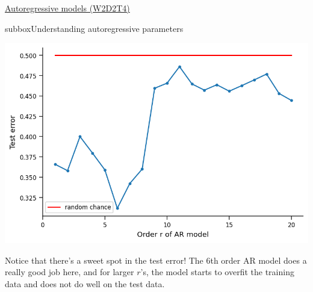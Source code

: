 \begin{textbox}{\href{https://compneuro.neuromatch.io/tutorials/W2D2_LinearSystems/student/W2D2_Tutorial4.html}{Autoregressive models (W2D2T4)} }
\begin{subbox}{subbox}{Understanding autoregressive parameters}
\begin{center}
\includegraphics[scale=0.3]{Figures/LS/CDS_Figure13.png}
\end{center}


Notice that there's a sweet spot in the test error! The 6th order AR model does a really good job here, and for larger $r$'s, the model starts to overfit the training data and does not do well on the test data.

\end{subbox}
\end{textbox}